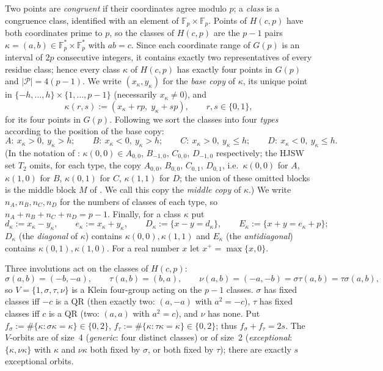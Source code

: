 \documentclass[11pt]{article}
\theoremstyle{remark}
\newcommand{\Fp}{\mathbb{F}_p}
\newcommand{\Hc}{H(c,p)}
\newcommand{\Gp}{G(p)}
\newcommand{\Pset}{\mathcal{P}}
\begin{document}
Two points are \emph{congruent} if their coordinates agree modulo $p$; a \emph{class} is a congruence class,
identified with an element of $\Fp\times\Fp$.  Points of $\Hc$ have both coordinates prime to $p$, so the classes of
$\Hc$ are the $p-1$ pairs $\kappa=(a,b)\in\Fp^*\times\Fp^*$ with $ab=c$.  Since each coordinate range of $\Gp$ is an
interval of $2p$ consecutive integers, it contains exactly two representatives of every residue class; hence
every class $\kappa$ of $\Hc$ has exactly four points in $\Gp$ and $|\Pset|=4(p-1)$.  We write
$(x_\kappa,y_\kappa)$ for the \emph{base copy} of $\kappa$, its unique point in
$\{-h,\dots,h\}\times\{1,\dots,p-1\}$ (necessarily $x_\kappa\ne0$), and
\[
 \kappa(r,s):=(x_\kappa+rp,\;y_\kappa+sp),\qquad r,s\in\{0,1\},
\]
for its four points in $\Gp$.  Following \cite{HJSW75,KNS25} we sort the classes into four \emph{types} according
to the position of the base copy:
\[
 A:\ x_\kappa>0,\ y_\kappa>h;\qquad B:\ x_\kappa<0,\ y_\kappa>h;\qquad C:\ x_\kappa>0,\ y_\kappa\le h;\qquad
 D:\ x_\kappa<0,\ y_\kappa\le h .
\]
(In the notation of \cite[Def.~2.3]{KNS25}: $\kappa(0,0)\in A_{0,0}$, $B_{-1,0}$, $C_{0,0}$, $D_{-1,0}$ respectively; the
HJSW set $T_2$ omits, for each type, the copy $A_{0,0}$, $B_{0,0}$, $C_{0,1}$, $D_{0,1}$, i.e.\ $\kappa(0,0)$ for
$A$, $\kappa(1,0)$ for $B$, $\kappa(0,1)$ for $C$, $\kappa(1,1)$ for $D$; the union of these omitted blocks is the middle
block $M$ of \cite[\S2.3]{KNS25}.  We call this copy the \emph{middle copy} of $\kappa$.)  We write $n_A,n_B,n_C,n_D$
for the numbers of classes of each type, so $n_A+n_B+n_C+n_D=p-1$.  Finally, for a class $\kappa$ put
\[
 d_\kappa:=x_\kappa-y_\kappa,\qquad e_\kappa:=x_\kappa+y_\kappa,\qquad
 D_\kappa:=\{x-y=d_\kappa\},\qquad E_\kappa:=\{x+y=e_\kappa+p\};
\]
$D_\kappa$ (the \emph{diagonal} of $\kappa$) contains $\kappa(0,0),\kappa(1,1)$ and $E_\kappa$ (the \emph{antidiagonal})
contains $\kappa(0,1),\kappa(1,0)$.  For a real number $x$ let $x^+=\max\{x,0\}$.

Three involutions act on the classes of $\Hc$:
\[
 \sigma(a,b)=(-b,-a),\qquad \tau(a,b)=(b,a),\qquad \nu(a,b)=(-a,-b)=\sigma\tau(a,b)=\tau\sigma(a,b),
\]
so $V=\{1,\sigma,\tau,\nu\}$ is a Klein four-group acting on the $p-1$ classes.  $\sigma$ has fixed classes iff $-c$ is a
QR (then exactly two: $(a,-a)$ with $a^2=-c$), $\tau$ has fixed classes iff $c$ is a QR (two: $(a,a)$ with $a^2=c$),
and $\nu$ has none.  Put $f_\sigma:=\#\{\kappa:\sigma\kappa=\kappa\}\in\{0,2\}$, $f_\tau:=\#\{\kappa:\tau\kappa=\kappa\}\in\{0,2\}$;
thus $f_\sigma+f_\tau=2s$.  The $V$-orbits are of size~4 (\emph{generic}: four distinct classes) or of size~2
(\emph{exceptional}: $\{\kappa,\nu\kappa\}$ with $\kappa$ and $\nu\kappa$ both fixed by $\sigma$, or both fixed by $\tau$);
there are exactly $s$ exceptional orbits.
\end{document}
